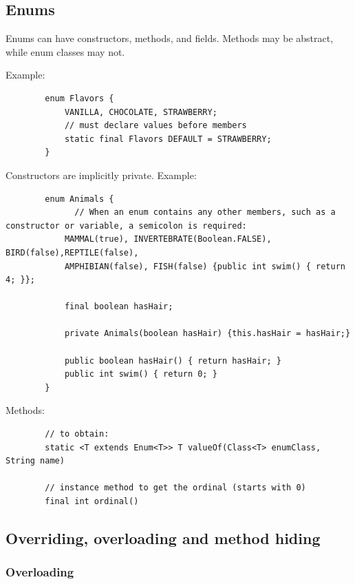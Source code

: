 \documentclass{scrartcl}
\begin{document}
\subsection{Enums}

    Enums can have constructors, methods, and fields. Methods may be abstract, while enum classes may not.

    Example:

        \begin{lstlisting}
        enum Flavors {
            VANILLA, CHOCOLATE, STRAWBERRY;
            // must declare values before members
            static final Flavors DEFAULT = STRAWBERRY;
        }
    \end{lstlisting}

    Constructors are implicitly private. Example:

     \begin{lstlisting}
        enum Animals {
              // When an enum contains any other members, such as a constructor or variable, a semicolon is required:
            MAMMAL(true), INVERTEBRATE(Boolean.FALSE), BIRD(false),REPTILE(false),
            AMPHIBIAN(false), FISH(false) {public int swim() { return 4; }};

            final boolean hasHair;

            private Animals(boolean hasHair) {this.hasHair = hasHair;}

            public boolean hasHair() { return hasHair; }
            public int swim() { return 0; }
        }

    \end{lstlisting}

    Methods:

    \begin{lstlisting}
        // to obtain:
        static <T extends Enum<T>> T valueOf(Class<T> enumClass, String name)

        // instance method to get the ordinal (starts with 0)
        final int ordinal()

    \end{lstlisting}

\subsection{Overriding, overloading and method hiding}
\subsubsection{Overloading}
\end{document}
